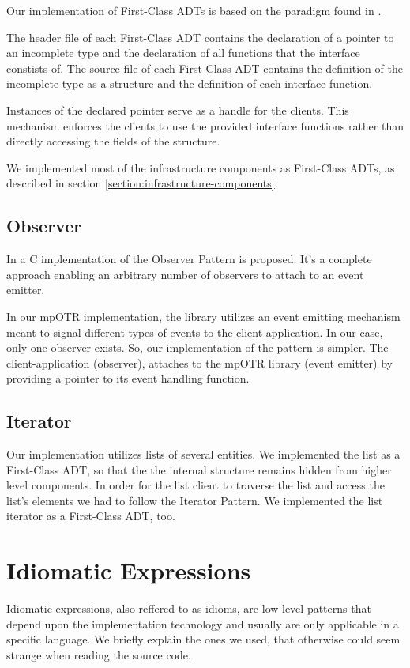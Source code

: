 Our implementation of First-Class ADTs is based on the paradigm found in \cite{patternsinc}.

The header file of each First-Class ADT contains the declaration of a pointer to an incomplete type and the declaration of all functions that the interface constists of. The source file of each First-Class ADT contains the definition of the incomplete type as a structure and the definition of each interface function.

Instances of the declared pointer serve as a handle for the clients. This mechanism enforces the clients to use the provided interface functions rather than directly accessing the fields of the structure.

We implemented most of the infrastructure components as First-Class ADTs, as described in section \ref{section:infrastructure-components}.

\subsection{Observer}
In \cite{patternsinc} a C implementation of the Observer Pattern is proposed. It's a complete approach enabling an arbitrary number of observers to attach to an event emitter.

In our mpOTR implementation, the library utilizes an event emitting mechanism meant to signal different types of events to the client application. In our case, only one observer exists. So, our implementation of the pattern is simpler. The client-application (observer), attaches to the mpOTR library (event emitter) by providing a pointer to its event handling function.

\subsection{Iterator}
Our implementation utilizes lists of several entities. We implemented the list as a First-Class ADT, so that the the internal structure remains hidden from higher level components. In order for the list client to traverse the list and access the list's elements we had to follow the Iterator Pattern. We implemented the list iterator as a First-Class ADT, too.

\section{Idiomatic Expressions}
Idiomatic expressions, also reffered to as idioms, are low-level patterns that depend upon the implementation technology and usually are only applicable in a specific language. We briefly explain the ones we used, that otherwise could seem strange when reading the source code.

